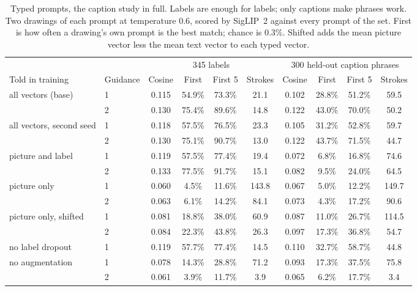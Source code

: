\documentclass{article}
\begin{document}
\begin{table}[H]
\caption{Typed prompts, the caption study in full. Labels are enough for labels; only captions make phrases work. Two drawings of each prompt at temperature 0.6, scored by SigLIP~2 against every prompt of the set. First is how often a drawing's own prompt is the best match; chance is 0.3\%. Shifted adds the mean picture vector less the mean text vector to each typed vector.}
\label{tab:typed}
\vskip 0.1in
\begin{center}
\begin{small}
\begin{tabular}{llcccccccc}
\toprule
 & & \multicolumn{4}{c}{345 labels} & \multicolumn{4}{c}{300 held-out caption phrases} \\
Told in training & Guidance & Cosine & First & First 5 & Strokes & Cosine & First & First 5 & Strokes \\
\midrule
all vectors (base) & 1 & 0.115 & 54.9\% & 73.3\% & 21.1 & 0.102 & 28.8\% & 51.2\% & 59.5 \\
 & 2 & 0.130 & 75.4\% & 89.6\% & 14.8 & 0.122 & 43.0\% & 70.0\% & 50.2 \\
all vectors, second seed & 1 & 0.118 & 57.5\% & 76.5\% & 23.3 & 0.105 & 31.2\% & 52.8\% & 59.7 \\
 & 2 & 0.130 & 75.1\% & 90.7\% & 13.0 & 0.122 & 43.7\% & 71.5\% & 44.7 \\
picture and label & 1 & 0.119 & 57.5\% & 77.4\% & 19.4 & 0.072 & 6.8\% & 16.8\% & 74.6 \\
 & 2 & 0.133 & 77.5\% & 91.7\% & 15.1 & 0.082 & 9.5\% & 24.0\% & 64.5 \\
picture only & 1 & 0.060 & 4.5\% & 11.6\% & 143.8 & 0.067 & 5.0\% & 12.2\% & 149.7 \\
 & 2 & 0.063 & 6.1\% & 14.2\% & 84.1 & 0.073 & 4.3\% & 17.2\% & 90.6 \\
picture only, shifted & 1 & 0.081 & 18.8\% & 38.0\% & 60.9 & 0.087 & 11.0\% & 26.7\% & 114.5 \\
 & 2 & 0.084 & 22.3\% & 43.8\% & 26.3 & 0.097 & 17.3\% & 36.8\% & 54.7 \\
no label dropout & 1 & 0.119 & 57.7\% & 77.4\% & 14.5 & 0.110 & 32.7\% & 58.7\% & 44.8 \\
no augmentation & 1 & 0.078 & 14.3\% & 28.8\% & 71.2 & 0.093 & 17.3\% & 37.5\% & 75.8 \\
 & 2 & 0.061 & 3.9\% & 11.7\% & 3.9 & 0.065 & 6.2\% & 17.7\% & 3.4 \\
\bottomrule
\end{tabular}
\end{small}
\end{center}
\end{table}
\end{document}
